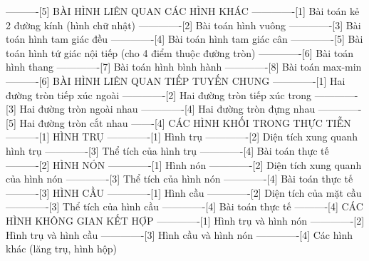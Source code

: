 ----------[5] BÀI HÌNH LIÊN QUAN CÁC HÌNH KHÁC
-------------[1] Bài toán kẻ 2 đường kính (hình chữ nhật)
-------------[2] Bài toán hình vuông
-------------[3] Bài toán hình tam giác đều
-------------[4] Bài toán hình tam giác cân
-------------[5] Bài toán hình tứ giác nội tiếp (cho 4 điểm thuộc đường tròn)
-------------[6] Bài toán hình thang
-------------[7] Bài toán hình bình hành
-------------[8] Bài toán max-min
----------[6] BÀI HÌNH LIÊN QUAN TIẾP TUYẾN CHUNG
-------------[1] Hai đường tròn tiếp xúc ngoài
-------------[2] Hai đường tròn tiếp xúc trong
-------------[3] Hai đường tròn ngoài nhau
-------------[4] Hai đường tròn đựng nhau
-------------[5] Hai đường tròn cắt nhau
-------[4] CÁC HÌNH KHỐI TRONG THỰC TIỄN
----------[1] HÌNH TRỤ
-------------[1] Hình trụ
-------------[2] Diện tích xung quanh hình trụ
-------------[3] Thể tích của hình trụ
-------------[4] Bài toán thực tế
----------[2] HÌNH NÓN
-------------[1] Hình nón
-------------[2] Diện tích xung quanh của hình nón
-------------[3] Thể tích của hình nón
-------------[4] Bài toán thực tế
----------[3] HÌNH CẦU
-------------[1] Hình cầu
-------------[2] Diện tích của mặt cầu
-------------[3] Thể tích của hình cầu
-------------[4] Bài toán thực tế
----------[4] CÁC HÌNH KHÔNG GIAN KẾT HỢP
-------------[1] Hình trụ và hình nón
-------------[2] Hình trụ và hình cầu
-------------[3] Hình cầu và hình nón
-------------[4] Các hình khác (lăng trụ, hình hộp)
